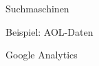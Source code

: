 \begin{frame}{Suchmaschinen}
\end{frame}

\begin{frame}{Beispiel: AOL-Daten}
\end{frame}

\begin{frame}{Google Analytics}
\end{frame}

